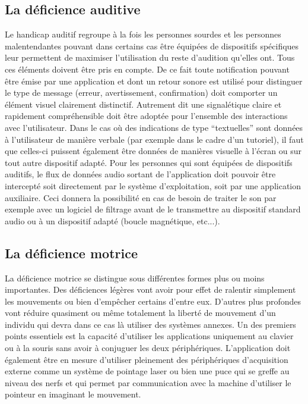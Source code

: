 \documentclass[french,a4paper]{report}
\begin{document}
\subsection{La déficience auditive}
Le handicap auditif regroupe à la fois les personnes sourdes et les personnes
malentendantes pouvant dans certains cas être équipées de dispositifs
spécifiques leur permettent de maximiser l'utilisation du reste d'audition
qu'elles ont. Tous ces éléments doivent être pris en compte. De ce fait toute
notification pouvant être émise par une application et dont un
retour sonore
est utilisé pour distinguer le type de message (erreur, avertissement,
confirmation) doit comporter un élément visuel clairement distinctif. Autrement
dit une signalétique claire et rapidement compréhensible doit être adoptée pour
l'ensemble des interactions avec l'utilisateur. \newline
Dans le cas où des indications de type \enquote{textuelles} sont données à l'utilisateur de manière
verbale (par exemple dans le cadre d'un tutoriel), il faut que celles-ci puissent également
être données de manières visuelle à l'écran ou sur tout autre dispositif adapté.
\newline
Pour les personnes qui sont équipées de dispositifs auditifs, le flux de données
audio sortant de l'application doit pouvoir être intercepté soit directement par
le système d'exploitation, soit par une application auxiliaire. Ceci donnera la
possibilité en cas de besoin de traiter le son par exemple avec un logiciel de
filtrage avant de le transmettre au dispositif standard audio ou à un dispositif
adapté (boucle magnétique, etc...).
\subsection{La déficience motrice}
La déficience motrice se distingue sous différentes formes plus ou moins importantes. Des déficiences légères vont avoir pour effet de ralentir simplement les mouvements ou bien d'empêcher certains d'entre eux. D'autres plus profondes vont réduire quasiment ou même totalement la liberté de mouvement d'un individu qui devra dans ce cas là utiliser des systèmes annexes.
Un des premiers points essentiels est la capacité d'utiliser les applications uniquement au clavier ou à la souris sans avoir à conjuguer les deux périphériques.
\newline
L'application doit également être en mesure d'utiliser pleinement des périphériques d'acquisition externe comme un système de pointage laser ou bien une puce qui se greffe au niveau des nerfs et qui permet par communication avec la machine d'utiliser le pointeur en imaginant le mouvement.
\end{document}
